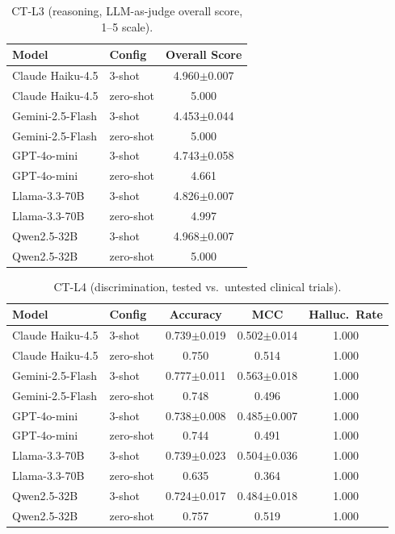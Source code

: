 \begin{table}[h]
\centering
\caption{CT-L3 (reasoning, LLM-as-judge overall score, 1--5 scale).}
\label{tab:ct_l3_full}
\scriptsize
\begin{tabular}{@{}llc@{}}
\toprule
\textbf{Model} & \textbf{Config} & \textbf{Overall Score} \\
\midrule
Claude Haiku-4.5 & 3-shot & 4.960$\pm$0.007 \\
Claude Haiku-4.5 & zero-shot & 5.000 \\
Gemini-2.5-Flash & 3-shot & 4.453$\pm$0.044 \\
Gemini-2.5-Flash & zero-shot & 5.000 \\
GPT-4o-mini & 3-shot & 4.743$\pm$0.058 \\
GPT-4o-mini & zero-shot & 4.661 \\
Llama-3.3-70B & 3-shot & 4.826$\pm$0.007 \\
Llama-3.3-70B & zero-shot & 4.997 \\
Qwen2.5-32B & 3-shot & 4.968$\pm$0.007 \\
Qwen2.5-32B & zero-shot & 5.000 \\
\bottomrule
\end{tabular}
\end{table}

\begin{table}[h]
\centering
\caption{CT-L4 (discrimination, tested vs.\ untested clinical trials).}
\label{tab:ct_l4_full}
\scriptsize
\begin{tabular}{@{}llccc@{}}
\toprule
\textbf{Model} & \textbf{Config} & \textbf{Accuracy} & \textbf{MCC} & \textbf{Halluc.\ Rate} \\
\midrule
Claude Haiku-4.5 & 3-shot & 0.739$\pm$0.019 & 0.502$\pm$0.014 & 1.000 \\
Claude Haiku-4.5 & zero-shot & 0.750 & 0.514 & 1.000 \\
Gemini-2.5-Flash & 3-shot & 0.777$\pm$0.011 & 0.563$\pm$0.018 & 1.000 \\
Gemini-2.5-Flash & zero-shot & 0.748 & 0.496 & 1.000 \\
GPT-4o-mini & 3-shot & 0.738$\pm$0.008 & 0.485$\pm$0.007 & 1.000 \\
GPT-4o-mini & zero-shot & 0.744 & 0.491 & 1.000 \\
Llama-3.3-70B & 3-shot & 0.739$\pm$0.023 & 0.504$\pm$0.036 & 1.000 \\
Llama-3.3-70B & zero-shot & 0.635 & 0.364 & 1.000 \\
Qwen2.5-32B & 3-shot & 0.724$\pm$0.017 & 0.484$\pm$0.018 & 1.000 \\
Qwen2.5-32B & zero-shot & 0.757 & 0.519 & 1.000 \\
\bottomrule
\end{tabular}
\end{table}

